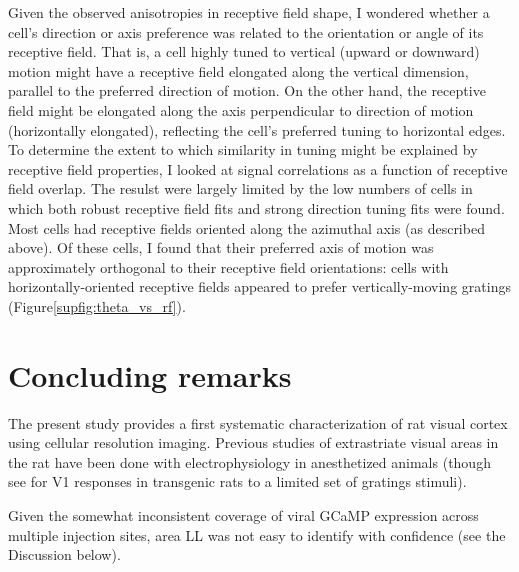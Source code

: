 Given the observed anisotropies in receptive field shape, I wondered whether a cell's direction or axis preference was related to the orientation or angle of its receptive field. That is, a cell highly tuned to vertical (upward or downward) motion might have a receptive field elongated along the vertical dimension, parallel to the preferred direction of motion. On the other hand, the receptive field might be elongated along the axis perpendicular to direction of motion (horizontally elongated), reflecting the cell's preferred tuning to horizontal edges. To determine the extent to which similarity in tuning might be explained by receptive field properties, I looked at signal correlations as a function of receptive field overlap. The resulst were largely limited by the low numbers of cells in which both robust receptive field fits and strong direction tuning fits were found. Most cells had receptive fields oriented along the azimuthal axis (as described above). Of these cells, I found that their preferred axis of motion was approximately orthogonal to their receptive field orientations:  cells with horizontally-oriented receptive fields appeared to prefer  vertically-moving gratings (Figure\ref{supfig:theta_vs_rf}). 


\section{Concluding remarks}
The present study provides a first systematic characterization of rat visual cortex using cellular resolution imaging. Previous studies of extrastriate visual areas in the rat have been done with electrophysiology in anesthetized animals\cite{Girman1999a, Vermaerke2014, Tafazoli2017} (though see \citet{Scott2018} for V1 responses in transgenic rats to a limited set of gratings stimuli).


Given the somewhat inconsistent coverage of viral GCaMP expression across multiple injection sites, area LL was not easy to identify with confidence (see the Discussion below).
